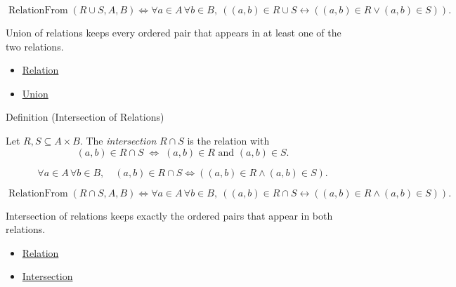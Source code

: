 \begin{remark*}
\[
  \operatorname{RelationFrom}(R\cup S,A,B)
  \iff
  \forall a\in A\,\forall b\in B,\ ((a,b)\in R\cup S \leftrightarrow ((a,b)\in R\vee(a,b)\in S)).
\]
\end{remark*}

\begin{remark*}[Interpretation]
Union of relations keeps every ordered pair that appears in at least one of
the two relations.
\end{remark*}

\begin{dependencies}
\begin{itemize}
  \item \hyperref[def:relation]{Relation}
  \item \hyperref[def:union]{Union}
\end{itemize}
\end{dependencies}

\begin{definitionbox}{Definition (Intersection of Relations)}
\begin{definition}\label{def:relation-intersection}
Let $R,S\subseteq A\times B$. The \emph{intersection} $R\cap S$ is the relation
with
\[
(a,b)\in R\cap S
\;\Longleftrightarrow\;
(a,b)\in R \text{ and } (a,b)\in S.
\]
\end{definition}
\end{definitionbox}

\begin{remark*}
\[
  \forall a\in A\,\forall b\in B,\quad
  (a,b)\in R\cap S
  \iff
  ((a,b)\in R\wedge(a,b)\in S).
\]
\end{remark*}

\begin{remark*}
\[
  \operatorname{RelationFrom}(R\cap S,A,B)
  \iff
  \forall a\in A\,\forall b\in B,\ ((a,b)\in R\cap S \leftrightarrow ((a,b)\in R\wedge(a,b)\in S)).
\]
\end{remark*}

\begin{remark*}[Interpretation]
Intersection of relations keeps exactly the ordered pairs that appear in both
relations.
\end{remark*}

\begin{dependencies}
\begin{itemize}
  \item \hyperref[def:relation]{Relation}
  \item \hyperref[def:intersection]{Intersection}
\end{itemize}
\end{dependencies}

